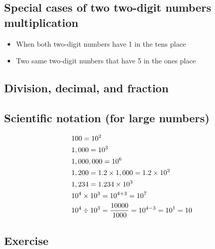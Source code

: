 \documentclass[12pt, svgnames]{article}
\newcommand{\thecmd}[1]{%
\pgfmathsetmacro{\a}{int(#1-#1/4)}%
\pgfmathsetmacro{\b}{int(#1+#1/4)}%
\pgfmathsetmacro{\thenum}{int(random(\a,\b))}%
\thenum%
}%
\begin{document}
\subsection*{Special cases of two two-digit numbers multiplication}

\begin{itemize}
\item When both two-digit numbers have 1 in the tens place
\item Two same two-digit nunbers that have 5 in the ones place
\end{itemize}


\subsection*{Division, decimal, and fraction}


\subsection*{Scientific notation (for large numbers)}
\begin{align*}
    & 100 = 10^2 \\
    & 1,000 = 10^3 \\
    & 1,000,000 = 10^6 \\
    & 1,200 = 1.2\times 1,000 = 1.2\times 10^3 \\
    & 1,234 = 1.234 \times 10^3 \\
    & 10^4 \times 10^3 = 10^{4+3} = 10^7 \\
    & 10^4 \div 10^3 = {10000\over1000} = 10^{4-3} = 10^1 = 10
\end{align*}

\subsection*{Exercise}

\end{document}
